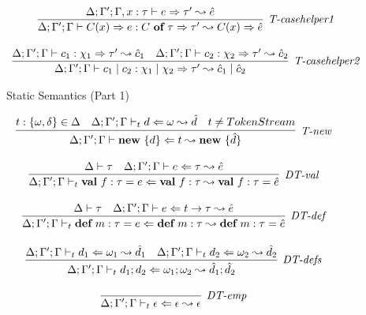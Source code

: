 \begin{figure}
\[\begin{array}{c}
\infer[\textit{T-casehelper1}]
	{\Delta; \Gamma'; \Gamma \vdash  C(x)\Rightarrow e : C\ \keyw{of}\ \tau \Rightarrow \tau' \leadsto C(x)\Rightarrow \hat{e}} 
	{\Delta; \Gamma'; \Gamma, x:\tau \vdash e \Rightarrow \tau' \leadsto \hat{e}}\\[3ex]

\infer[\textit{T-casehelper2}]
	{\Delta; \Gamma'; \Gamma \vdash  c_1 \bnfalt c_2: \chi_1 \bnfalt \chi_2 \Rightarrow \tau' \leadsto \hat{c}_1 \bnfalt \hat{c}_2 } 
	{\Delta; \Gamma'; \Gamma \vdash c_1:\chi_1 \Rightarrow \tau' \leadsto \hat{c}_1 & \Delta; \Gamma'; \Gamma \vdash c_2:\chi_2 \Rightarrow \tau' \leadsto \hat{c}_2}
\end{array}
\]
\label{fig:statics1}
\caption{Static Semantics  (Part 1)}
\end{figure}

\begin{figure}
\centering
\[
\begin{array}{c}

\infer[\textit{T-new}]
	{\Delta; \Gamma'; \Gamma \vdash \keyw{new}\ \{ d \} \Leftarrow  t \leadsto \keyw{new}\ \{\hat d\}}
	{ t:\{\omega, \delta\} \in \Delta & \Delta; \Gamma'; \Gamma \vdash_t d \Leftarrow \omega \leadsto \hat d & t\neq TokenStream} \\[3ex]

\infer[\textit{DT-val}]
	{\Delta; \Gamma'; \Gamma \vdash_t \keyw{val}~ f:\tau = e \Leftarrow \keyw{val}~ f:\tau  \leadsto \keyw{val}~ f:\tau = \hat{e}}
	{\Delta \vdash \tau &\Delta; \Gamma'; \Gamma \vdash e \Leftarrow \tau \leadsto \hat{e} } \\[3ex]
	
\infer[\textit{DT-def}]
	{\Delta; \Gamma'; \Gamma \vdash_t \keyw{def}~ m:\tau = e \Leftarrow \keyw{def}~ m:\tau \leadsto \keyw{def}~ m:\tau = \hat{e} }
	{\Delta \vdash \tau  & \Delta; \Gamma'; \Gamma \vdash e  \Leftarrow t \rightarrow \tau \leadsto \hat{e} } \\[3ex]

	
\infer[\textit{DT-defs}]
	{\Delta; \Gamma'; \Gamma \vdash_t d_1; d_2 \Leftarrow \omega_1; \omega_2 \leadsto \hat{d}_1; \hat{d}_2 }
	{\Delta; \Gamma'; \Gamma \vdash_t d_1 \Leftarrow \omega_1 \leadsto \hat{d}_1&  \Delta; \Gamma'; \Gamma \vdash_t d_2 \Leftarrow \omega_2 \leadsto \hat{d}_2 }\\[3ex]

\infer[\textit{DT-emp}]
	{\Delta; \Gamma'; \Gamma \vdash_t \epsilon \Leftarrow \epsilon \leadsto \epsilon}
	{ }\\[3ex]


\end{array}\]
\end{figure}
